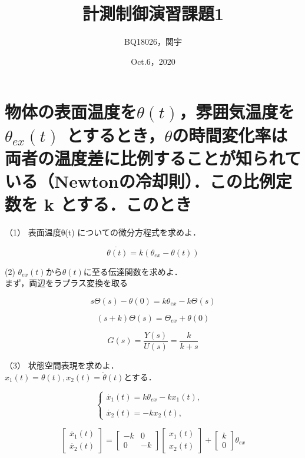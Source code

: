 \documentclass[xelatex,ja=standard,jafont=noto]{bxjsarticle}
\title{計測制御演習課題1	}
\author{BQ18026，関宇 }
\date{Oct.6，2020}
\begin{document}
		\maketitle
		
		
		
	\section{物体の表面温度を$ \theta(t)$，雰囲気温度を$ \theta_{ex}(t) $ とするとき，$ \theta$の時間変化率は両者の温度差に比例することが知られている（Newtonの冷却則）．この比例定数を k とする．このとき}
	
（1） 表面温度θ(t) についての微分方程式を求めよ．

\begin{equation}
	\dot{\theta(t)}=k(\theta_{ex}-\theta(t))
\end{equation}
	
	(2) $ \theta_{ex}(t)$から$ \theta(t)$に至る伝達関数を求めよ．\\
	
まず，両辺をラプラス変換を取る

\begin{equation}
	s\Theta(s)-\theta(0)=k\theta_{ex}-k\Theta(s)
\end{equation}

\begin{equation}
	(s+k)\Theta(s)=\Theta_{ex}+\theta(0)
\end{equation}

\begin{equation}
	G(s)=\frac{Y(s)}{U(s)}=\frac{k}{k+s}
\end{equation}

（3） 状態空間表現を求めよ．\\

$ x_{1}(t)=\theta(t),x_{2}(t)=\dot{\theta}(t) $とする．

\begin{equation}
\left\{
             \begin{array}{lr}
             \dot{x_{1}}(t)=k\theta_{ex}-kx_{1}(t), & \\
             &\\
             \dot{x_{2}}(t)=-kx_{2}(t), & 
             \end{array}
\right.
\end{equation}

\begin{equation}
    {
\left[ \begin{array}{c}
\dot{x_{1}}(t)\\
\dot{x_{2}}(t)
\end{array}
\right ]}={
\left[ \begin{array}{cc}
-k&0\\
0&-k
\end{array}
\right ]}{
\left[ \begin{array}{c}
x_{1}(t)\\
x_{2}(t)
\end{array}
\right ]}
+{
\left[ \begin{array}{c}
k\\
0
\end{array}
\right ]}\theta_{ex}
\end{equation}
\end{document}
